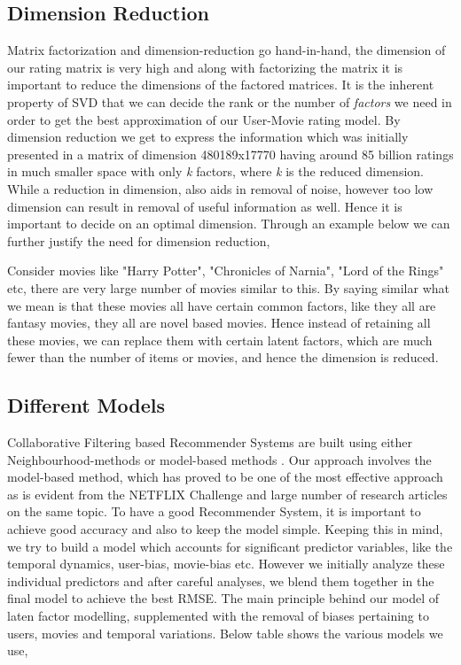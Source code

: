 \subsection{Dimension Reduction}
Matrix factorization and dimension-reduction go hand-in-hand, the dimension of
our rating matrix is very high and along with factorizing the matrix it is
important to reduce the dimensions of the factored matrices. It is the inherent
property of SVD that we can decide the rank or the number of \emph{factors} we
need in order to get the best approximation of our User-Movie rating model. By
dimension reduction we get to express the information which was initially
presented
in a matrix of dimension 480189x17770 having around 85 billion ratings in much
smaller space with only \emph{k} factors, where \emph{k} is the reduced
dimension.
While a reduction in dimension, also aids in removal of noise, however too low
dimension
can result in removal of useful information as well. Hence it is important to
decide on an optimal dimension. Through an example below we can further justify
the
need for dimension reduction,
\begin{example}
 Consider movies like "Harry Potter", "Chronicles of Narnia", "Lord of the
Rings" etc, there are very large number of movies similar to this. By saying
similar what we mean is that these movies all have certain common factors, like
they all are fantasy movies, they all are novel based movies. Hence instead of
retaining all these movies, we can replace them with certain latent factors,
which are much fewer than the number of items or movies, and hence the dimension
is reduced.
\end{example}


\subsection{Different Models}
Collaborative Filtering based Recommender Systems are built using either
Neighbourhood-methods or model-based methods
\cite{Koren:2008:FMN:1401890.1401944}. Our approach involves the
model-based method, which has proved to be one of the most effective approach as
is evident from the NETFLIX Challenge and large number of research articles on
the same topic. To have a good Recommender System, it is important to achieve
good accuracy and also to keep the model simple. Keeping this in mind, we try to
build a model which accounts for significant predictor variables, like the
temporal dynamics, user-bias, movie-bias etc. However we initially analyze these
individual predictors and after careful analyses, we blend them together in the
final model to achieve the best RMSE. The main principle behind our model of
laten factor modelling, supplemented with the removal of biases pertaining to
users, movies and temporal variations. Below table shows the various models we
use, 

